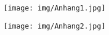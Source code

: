 \begin{figure*}
    \centering
    \texttt{[image: img/Anhang1.jpg]}
\end{figure*}
\begin{figure*}
    \centering
    \texttt{[image: img/Anhang2.jpg]}
\end{figure*}